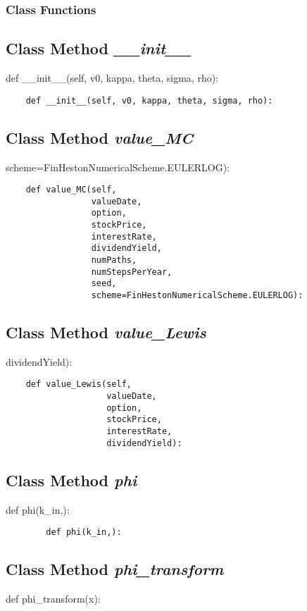 \documentclass[twoside,11pt]{book}
\begin{document}
\subsubsection{Class Functions}

\subsection{Class Method {\it \_\_init\_\_}}
def \_\_init\_\_(self, v0, kappa, theta, sigma, rho):

\begin{lstlisting}
    def __init__(self, v0, kappa, theta, sigma, rho):
\end{lstlisting}

\subsection{Class Method {\it value\_MC}}
scheme=FinHestonNumericalScheme.EULERLOG):

\begin{lstlisting}
    def value_MC(self,
                 valueDate,
                 option,
                 stockPrice,
                 interestRate,
                 dividendYield,
                 numPaths,
                 numStepsPerYear,
                 seed,
                 scheme=FinHestonNumericalScheme.EULERLOG):
\end{lstlisting}

\subsection{Class Method {\it value\_Lewis}}
dividendYield):

\begin{lstlisting}
    def value_Lewis(self,
                    valueDate,
                    option,
                    stockPrice,
                    interestRate,
                    dividendYield):
\end{lstlisting}

\subsection{Class Method {\it phi}}
def phi(k\_in,):

\begin{lstlisting}
        def phi(k_in,):
\end{lstlisting}

\subsection{Class Method {\it phi\_transform}}
def phi\_transform(x):
\end{document}
